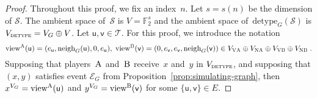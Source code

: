 \documentclass[11pt]{article}
\theoremstyle{definition}
\newcommand{\F}{\ensuremath{\mathbb{F}}}
\newcommand{\sampler}{\mathcal{S}}
\newcommand{\detype}{\mathrm{detype}}
\newcommand{\type}{\mathcal{T}}
\newcommand{\gamestyle}[1]{\ensuremath{\textsc{#1}}\xspace}
\newcommand{\labelstyle}[1]{\ensuremath{\textsc{#1}}\xspace}
\newcommand{\vertex}[1]{\labelstyle{V#1}}
\newcommand{\edge}[1]{\labelstyle{N#1}}
\newcommand{\tvarstyle}[1]{\mathsf{#1}}
\newcommand{\lvar}{\ensuremath{\tvarstyle{u}}}
\newcommand{\rvar}{\ensuremath{\tvarstyle{v}}}
\newcommand{\alice}{\labelstyle{A}}
\newcommand{\bob}{\labelstyle{B}}
\begin{document}
\begin{proof}
  Throughout this proof, we fix an index~$n$.
  Let $s = s(n)$ be the dimension of $\sampler$.
  The ambient space of~$\sampler$ is $V = \F_2^s$ and the ambient space
  of~$\detype_G(\sampler)$ is $V_{\gamestyle{detype}} = V_G \oplus V$.
  Let $\lvar, \rvar \in \type$.
  For this proof, we introduce the notation
  \begin{equation*}
    \mathrm{view}^\alice(\lvar) =
    (e_\lvar, \mathrm{neigh}_G(\lvar), 0, e_\lvar),\;
    \mathrm{view}^\bob(\rvar) =
    (0, e_\rvar, e_\rvar, \mathrm{neigh}_G(\rvar))
    \in V_{\vertex{\alice}} \oplus V_{\edge{\alice}}
    \oplus V_{\vertex{\bob}} \oplus V_{\edge{\bob}}\;.
\end{equation*}
Supposing that players~\alice and~\bob receive~$x$ and~$y$ in
$V_{\gamestyle{detype}}$, and supposing that $(x, y)$ satisfies event
$\mathcal{E}_G$ from Proposition~\ref{prop:simulating-graph}, then $x^{V_G} =
\mathrm{view}^\alice(\lvar)$ and $y^{V_G} = \mathrm{view}^\bob(\rvar)$ for some
$\{\lvar, \rvar\} \in E$.


\end{proof}
\end{document}
